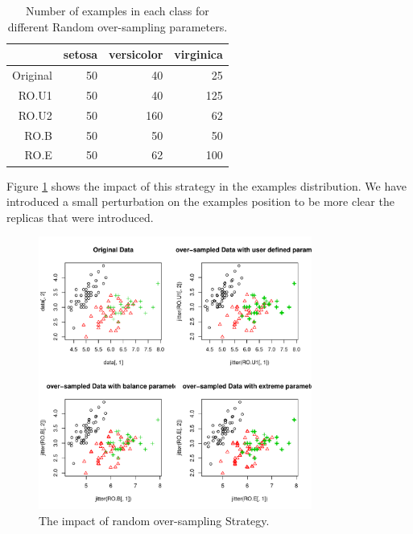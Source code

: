 \documentclass[10pt,a4paper]{article}\usepackage[]{graphicx}\usepackage[]{color}
\newenvironment{knitrout}{}{} %
\begin{document}
\begin{table}[ht]
\centering
\begin{tabular}{rrrr}
  \hline
 & setosa & versicolor & virginica \\ 
  \hline
Original &  50 &  40 &  25 \\ 
  RO.U1 &  50 &  40 & 125 \\ 
  RO.U2 &  50 & 160 &  62 \\ 
  RO.B &  50 &  50 &  50 \\ 
  RO.E &  50 &  62 & 100 \\ 
   \hline
\end{tabular}
\caption{Number of examples in each class for different Random over-sampling parameters.} 
\label{tab:RO_tab}
\end{table}

Figure \ref{fig:IrisRO} shows the impact of this strategy in the examples distribution. We have introduced a small perturbation on the examples position to be more clear the replicas that were introduced.

\begin{knitrout}\footnotesize
{}\color{fgcolor}\begin{figure}

{\centering \includegraphics[width=0.8\textwidth]{figures/UBL-IrisRO-1} 

}

\caption[The impact of random over-sampling Strategy]{The impact of random over-sampling Strategy.}\label{fig:IrisRO}
\end{figure}


\end{knitrout}
\end{document}

